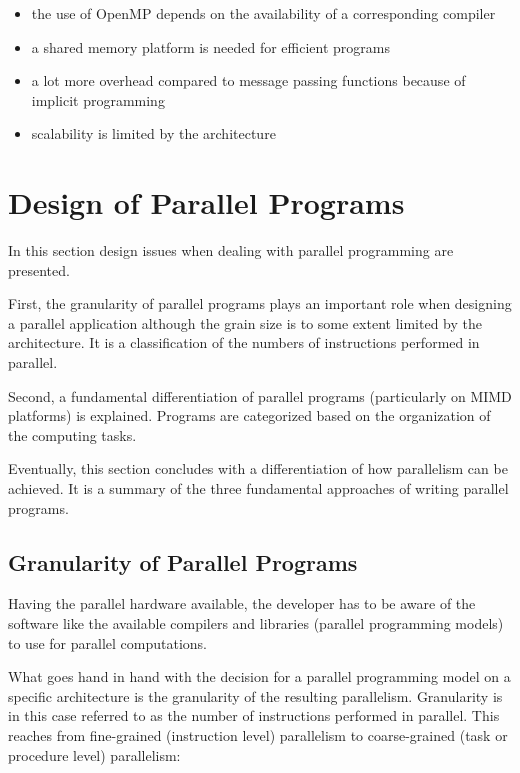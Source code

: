 \begin{itemize}
\item the use of OpenMP depends on the availability of a corresponding
  compiler
\item a shared memory platform is needed for efficient programs
\item a lot more overhead compared to message passing functions because
  of implicit programming
\item scalability is limited by the architecture
\end{itemize}

\section{Design of Parallel Programs}
\label{sec:designofpar}
In this section design issues when dealing with parallel programming
are presented.

First, the granularity of parallel programs plays an important role when
designing a parallel application although the grain size is to some
extent limited by the architecture. It is a classification of the
numbers of instructions performed in parallel.

Second, a fundamental differentiation of parallel programs
(particularly on MIMD platforms) is explained. Programs are
categorized based on the organization of the computing tasks.

Eventually, this section concludes with a differentiation of how
parallelism can be achieved. It is a summary of the three fundamental
approaches of writing parallel programs.

\subsection{Granularity of Parallel Programs}

Having the parallel hardware available, the developer has to be aware
of the software like the available compilers and
libraries (parallel programming models) to use for parallel
computations.

What goes hand in hand with the decision for a parallel programming
model on a specific architecture is the granularity of the resulting
parallelism. Granularity is in this case referred to as the
number of instructions performed in parallel. This reaches from
fine-grained (instruction level) parallelism to coarse-grained (task
or procedure level) parallelism:
 
